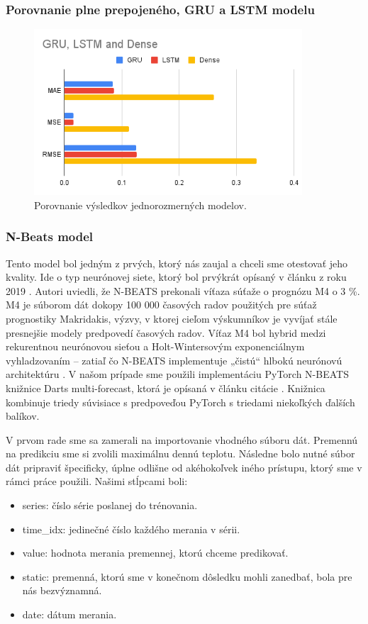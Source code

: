 \subsubsection{Porovnanie plne prepojeného, GRU a LSTM modelu}
\begin{figure}[!htbp]
  \centering
  \includegraphics[width=10cm]{img/GRU, LSTM and Dense.png}
  \caption{Porovnanie výsledkov jednorozmerných modelov.}
  \label{univariate}
\end{figure}

\subsubsection{N-Beats model} 
Tento model bol jedným z prvých, ktorý nás zaujal a chceli sme otestovať jeho kvality. Ide o typ neurónovej siete, ktorý bol prvýkrát opísaný v článku z roku 2019 \cite{n-beats}. Autori uviedli, že N-BEATS prekonali víťaza súťaže o prognózu M4 o 3 \%. M4 je súborom dát dokopy 100 000 časových radov použitých pre súťaž prognostiky Makridakis, výzvy, v ktorej cieľom výskumníkov je vyvíjať stále presnejšie modely predpovedí časových radov. Víťaz M4 bol hybrid medzi rekurentnou neurónovou sieťou a Holt-Wintersovým exponenciálnym vyhladzovaním – zatiaľ čo N-BEATS implementuje „čistú“ hlbokú neurónovú architektúru \cite{m4}. V našom prípade sme použili implementáciu PyTorch N-BEATS knižnice Darts multi-forecast, ktorá je opísaná v článku citácie \cite{beat-impl}. Knižnica kombinuje triedy súvisiace s predpoveďou PyTorch s triedami niekoľkých ďalších balíkov. 

V prvom rade sme sa zamerali na importovanie vhodného súboru dát. Premennú na predikciu sme si zvolili maximálnu dennú teplotu. Následne bolo nutné súbor dát pripraviť špecificky, úplne odlišne od akéhokoľvek iného prístupu, ktorý sme v rámci práce použili. Našimi stĺpcami boli:
\begin{itemize}
    \item series: číslo série poslanej do trénovania.
    \item time\_idx: jedinečné číslo každého merania v sérii.
    \item value: hodnota merania premennej, ktorú chceme predikovať.
    \item static: premenná, ktorú sme v konečnom dôsledku mohli zanedbať, bola pre nás bezvýznamná.
    \item date: dátum merania.
\end{itemize}

